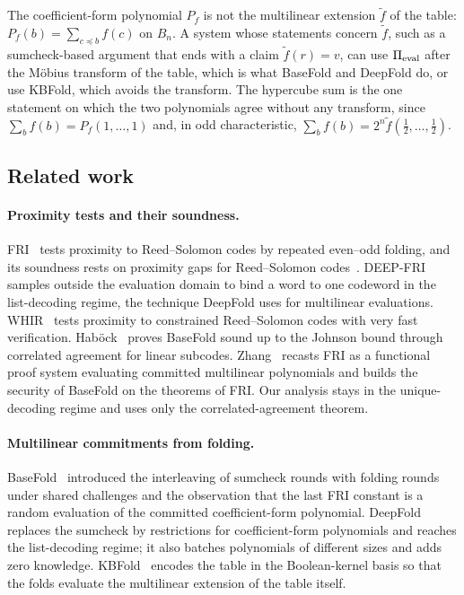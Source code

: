 The coefficient-form polynomial $P_f$ is not the multilinear extension $\tilde f$ of the table: $P_f(b) = \sum_{c \preceq b} f(c)$ on $B_n$.
A system whose statements concern $\tilde f$, such as a sumcheck-based argument that ends with a claim $\tilde f(r) = v$, can use $\Pi_{\mathrm{eval}}$ after the M\"obius transform of the table, which is what BaseFold and DeepFold do, or use KBFold, which avoids the transform.
The hypercube sum is the one statement on which the two polynomials agree without any transform, since $\sum_b f(b) = P_f(1,\dots,1)$ and, in odd characteristic, $\sum_b f(b) = 2^n \tilde f(\tfrac12,\dots,\tfrac12)$.

\subsection{Related work}\label{sec:intro:related}

\paragraph{Proximity tests and their soundness.}
FRI~\cite{BBHR18} tests proximity to Reed--Solomon codes by repeated even--odd folding, and its soundness rests on proximity gaps for Reed--Solomon codes~\cite{BCIKS23}.
DEEP-FRI~\cite{BGKS20} samples outside the evaluation domain to bind a word to one codeword in the list-decoding regime, the technique DeepFold uses for multilinear evaluations.
WHIR~\cite{ACFY24} tests proximity to constrained Reed--Solomon codes with very fast verification.
Hab\"ock~\cite{Hab24} proves BaseFold sound up to the Johnson bound through correlated agreement for linear subcodes.
Zhang~\cite{Zha25} recasts FRI as a functional proof system evaluating committed multilinear polynomials and builds the security of BaseFold on the theorems of FRI.
Our analysis stays in the unique-decoding regime and uses only the correlated-agreement theorem.

\paragraph{Multilinear commitments from folding.}
BaseFold~\cite{ZCF24} introduced the interleaving of sumcheck rounds with folding rounds under shared challenges and the observation that the last FRI constant is a random evaluation of the committed coefficient-form polynomial.
DeepFold~\cite{GLHQTZ25} replaces the sumcheck by restrictions for coefficient-form polynomials and reaches the list-decoding regime; it also batches polynomials of different sizes and adds zero knowledge.
KBFold~\cite{Mkh26} encodes the table in the Boolean-kernel basis so that the folds evaluate the multilinear extension of the table itself.


